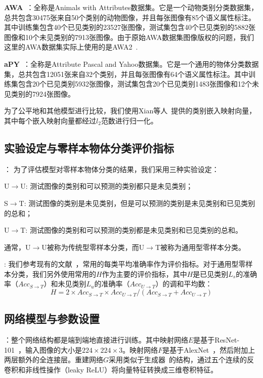 \textbf{AWA}~\cite{lampert2009learning}：全称是Animals with Attributes数据集。它是一个动物类别分类数据集，总共包含30475张来自50个类别的动物图像，并且每张图像有85个语义属性标注。其中训练集包含40个已见类别的23527张图像，测试集包含40个已见类别的5882张图像和10个未见类别的7913张图像。由于原始AWA数据集图像版权的问题，我们这里的AWA数据集实际上使用的是AWA2~\cite{xian2017zero}.

\textbf{aPY}~\cite{farhadi2009describing}：全称是Attribute Pascal and Yahoo数据集。它是一个通用的物体分类数据集，总共包含12051张来自32个类别，并且每张图像有64个语义属性标注。其中训练集包含20个已见类别5932张图像，测试集包含20个已见类别1483张图像和12个未见类别的7924张图像。

为了公平地和其他模型进行比较，我们使用Xian等人~\cite{xian2017zero}提供的类别嵌入映射向量，其中每个嵌入映射向量都经过$l_2$范数进行归一化。


\subsection{实验设定与零样本物体分类评价指标}
：
为了评估模型对零样本物体分类的结果，我们采用三种实验设定：
\begin{asparaenum}
\item U$\to$U: 测试图像的类别和可以预测的类别都只是未见类别；

\item S$\to$T: 测试图像的类别是未见类别，但是可以预测的类别是未见类别和已见类别的总和；

\item U$\to$T: 测试图像的类别和可以预测的类别都是未见类别和已见类别的总和。
\end{asparaenum}
通常，U$\to$U被称为传统型零样本分类，而U$\to$T被称为通用型零样本分类。

:
我们参考现有的文献~\cite{xian2017zero}，常用的每类平均准确率作为评价指标。对于通用型零样本分类，我们另外使用常用的$H$作为主要的评价指标，其中$H$是已见类别$L_s$的准确率（$Acc_{S\rightarrow T}$）和未见类别$L_u$的准确率（$Acc_{U\rightarrow T}$）的调和平均数：
\begin{equation} \label{ch3:eq:eq_7}
H = 2\times Acc_{S\rightarrow T}\times Acc_{U\rightarrow T} /(Acc_{S\rightarrow T}+Acc_{U\rightarrow T})
\end{equation}

\subsection{网络模型与参数设置}
：整个网络结构都是端到端地直接进行训练。其中映射网络$E$是基于ResNet-101~\cite{he2016deep}，输入图像的大小是$224\times224\times3$。映射网络$F$是基于AlexNet~\cite{krizhevsky2012imagenet}，然后附加上两层额外的全连接层。重建网络$G$采用类似于生成器~\cite{dosovitskiy2016generating}的结构，通过五个连续的反卷积和非线性操作（leaky ReLU）将向量特征转换成三维卷积特征。


